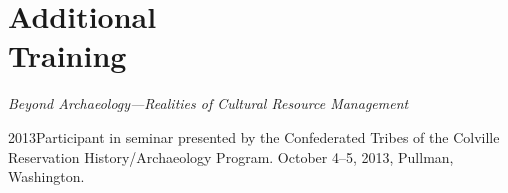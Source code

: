 
\section{Additional \\ Training}

\emph{Beyond Archaeology—Realities of Cultural Resource Management}
\begin{list1}
\item[] 2013\hspace{.2cm}Participant in seminar presented by the Confederated Tribes of the Colville Reservation History/Archaeology Program. October 4–5, 2013, Pullman, Washington.
\end{list1}


